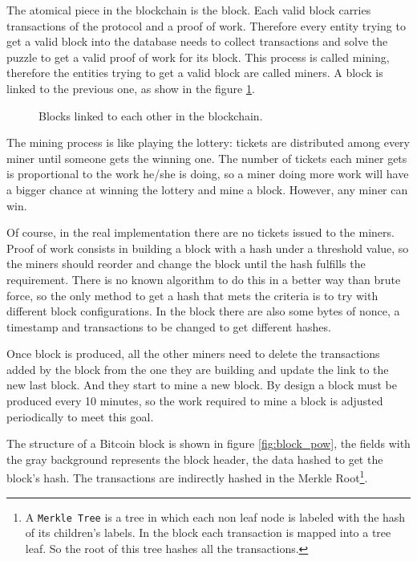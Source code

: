The atomical piece in the blockchain is the block. Each valid block carries
  transactions of the protocol and a proof of work. Therefore every entity
  trying to get a valid block into the database needs to collect transactions
  and solve the puzzle to get a valid proof of work for its block.
This process is called mining, therefore the entities trying to get a valid
  block are called miners. A block is linked to the previous one, as show in the
  figure \ref{fig:block_links}.

\begin{figure}
	\centering
	\def\svgwidth{\columnwidth}
	
	\caption{Blocks linked to each other in the blockchain.}
	\label{fig:block_links}
\end{figure}

The mining process is like playing the lottery: tickets are distributed  among
  every miner until someone gets the winning one. The number of tickets each
  miner gets is proportional to the work he/she is doing, so a miner doing more
  work will have a bigger chance at winning the lottery and mine a block.
However, any miner can win.

Of course, in the real implementation there are no tickets issued to the
  miners.
Proof of work consists in building a block with a hash under a threshold value,
  so the miners should reorder and change the block until the hash fulfills the
  requirement.
There is no known algorithm to do this in a better way than brute force, so the
  only method to get a hash that mets the criteria is to try with different
  block configurations. In the block there are also some bytes of nonce, a
  timestamp and transactions to be changed to get different hashes.

Once block is produced, all the other miners need to delete the transactions
  added by the block from the one they are building and update the link to the
  new last block. And they start to mine a new block.
By design a block must be produced every 10 minutes, so the work required to
  mine a block is adjusted periodically to meet this goal.

The structure of a Bitcoin block is shown in figure \ref{fig:block_pow}, the
  fields with the gray background represents the block header, the data hashed
  to get the block's hash.
The transactions are indirectly hashed in the Merkle Root\footnote{A
  \texttt{Merkle Tree} is a tree in which each non leaf node is labeled with
  the hash of its children's labels. In the block each transaction is mapped
  into a tree leaf. So the root of this tree hashes all the transactions.}.

